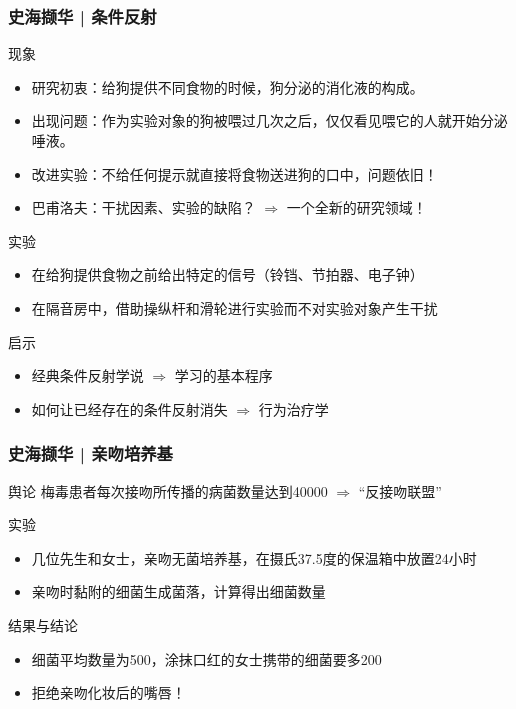 \begin{frame}
  \frametitle{史海撷华 | 条件反射}
  \begin{block}{现象}
    \begin{itemize}
      \item 研究初衷：给狗提供不同食物的时候，狗分泌的消化液的构成。
      \item 出现问题：作为实验对象的狗被喂过几次之后，仅仅看见喂它的人就开始分泌唾液。
      \item 改进实验：不给任何提示就直接将食物送进狗的口中，问题依旧！
      \item 巴甫洛夫：干扰因素、实验的缺陷？ $\Longrightarrow$ 一个全新的研究领域！
    \end{itemize}
  \end{block}
  \vspace{-0.5em}
  \pause
  \begin{block}{实验}
    \begin{itemize}
      \item 在给狗提供食物之前给出特定的信号（铃铛、节拍器、电子钟）
      \item 在隔音房中，借助操纵杆和滑轮进行实验而不对实验对象产生干扰
    \end{itemize}
  \end{block}
  \vspace{-0.5em}
  \pause
  \begin{block}{启示}
    \begin{itemize}
      \item 经典条件反射学说 $\Longrightarrow$ 学习的基本程序
      \item 如何让已经存在的条件反射消失 $\Longrightarrow$ 行为治疗学
    \end{itemize}
  \end{block}
\end{frame}

\begin{frame}
  \frametitle{史海撷华 | 亲吻培养基}
  \begin{block}{舆论}
    梅毒患者每次接吻所传播的病菌数量达到40000 $\Longrightarrow$ “反接吻联盟”
  \end{block}
  \pause
  \begin{block}{实验}
    \begin{itemize}
      \item 几位先生和女士，亲吻无菌培养基，在摄氏37.5度的保温箱中放置24小时
      \item 亲吻时黏附的细菌生成菌落，计算得出细菌数量
    \end{itemize}
  \end{block}
  \pause
  \begin{block}{结果与结论}
    \begin{itemize}
      \item 细菌平均数量为500，涂抹口红的女士携带的细菌要多200
      \item 拒绝亲吻化妆后的嘴唇！
    \end{itemize}
  \end{block}
\end{frame}

